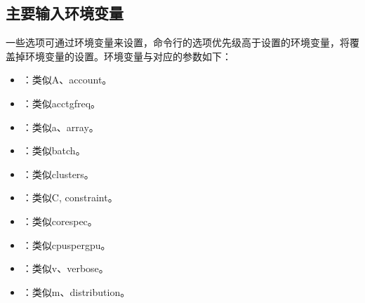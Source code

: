\documentclass[a4paper,12pt,english]{sphinxmanual}
\begin{document}
\subsection{主要输入环境变量}
\label{\detokenize{slurm/slurm:id25}}\label{\detokenize{slurm/slurm:id26}}
\sphinxAtStartPar
一些选项可通过环境变量来设置，命令行的选项优先级高于设置的环境变量，将覆盖掉环境变量的设置。环境变量与对应的参数如下：
\begin{itemize}
\item {} 
\sphinxAtStartPar
{}：类似\sphinxhyphen{}A、\sphinxhyphen{}\sphinxhyphen{}account。

\item {} 
\sphinxAtStartPar
{}：类似\sphinxhyphen{}\sphinxhyphen{}acctg\sphinxhyphen{}freq。

\item {} 
\sphinxAtStartPar
{}：类似\sphinxhyphen{}a、\sphinxhyphen{}\sphinxhyphen{}array。

\item {} 
\sphinxAtStartPar
{}：类似\sphinxhyphen{}\sphinxhyphen{}batch。

\item {} 
\sphinxAtStartPar
{}：类似\sphinxhyphen{}\sphinxhyphen{}clusters。

\item {} 
\sphinxAtStartPar
{}：类似\sphinxhyphen{}C, \sphinxhyphen{}\sphinxhyphen{}constraint。

\item {} 
\sphinxAtStartPar
{}：类似\sphinxhyphen{}\sphinxhyphen{}core\sphinxhyphen{}spec。

\item {} 
\sphinxAtStartPar
{}：类似\sphinxhyphen{}\sphinxhyphen{}cpus\sphinxhyphen{}per\sphinxhyphen{}gpu。

\item {} 
\sphinxAtStartPar
{}：类似\sphinxhyphen{}v、\sphinxhyphen{}\sphinxhyphen{}verbose。

\item {} 
\sphinxAtStartPar
{}：类似\sphinxhyphen{}m、\sphinxhyphen{}\sphinxhyphen{}distribution。


\end{itemize}
\end{document}
